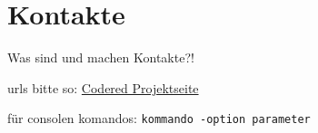 \chapter{Kontakte}  %
\label{chapter:Kontakte}  %

Was sind und machen Kontakte?!

urls bitte so:
\href{http://codered.berlios.de}{Codered Projektseite}


für consolen komandos:
\verb|kommando -option parameter|

